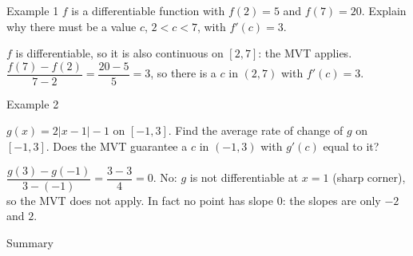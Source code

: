 \begin{nrow}{Example 1}
$f$ is a differentiable function with $f(2)=5$ and $f(7)=20$. Explain why there must be a value $c$, $2<c<7$, with $f'(c)=3$.
\begin{workspace}[2.4cm]
$f$ is differentiable, so it is also continuous on $[2,7]$: the MVT applies. $\dfrac{f(7)-f(2)}{7-2}=\dfrac{20-5}{5}=3$, so there is a $c$ in $(2,7)$ with $f'(c)=3$.
\end{workspace}
\end{nrow}
\begin{nrow}{Example 2}
\begin{minipage}[t]{0.45\linewidth}\vspace{0pt}
\end{minipage}\hfill
\begin{minipage}[t]{0.52\linewidth}\vspace{2pt}
$g(x)=2|x-1|-1$ on $[-1,3]$. Find the average rate of change of $g$ on $[-1,3]$. Does the MVT guarantee a $c$ in $(-1,3)$ with $g'(c)$ equal to it?
\end{minipage}
\begin{workspace}[2cm]
$\dfrac{g(3)-g(-1)}{3-(-1)}=\dfrac{3-3}{4}=0$. No: $g$ is not differentiable at $x=1$ (sharp corner), so the MVT does not apply. In fact no point has slope $0$: the slopes are only $-2$ and $2$.
\end{workspace}
\end{nrow}
\begin{nrow}{Summary}
\else\vspace{2.2cm}\fi
\end{nrow}

